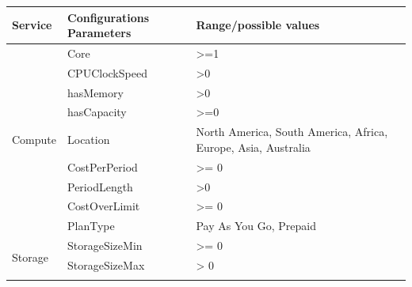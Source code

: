 \begin{table}
\begin{tabular}{|l|p{5.5cm}|p{5.5cm}|}
\hline
Service                  & Configurations Parameters                                         & Range/possible values                                         \\ \hline
\multirow{9}{*}{Compute} & Core                                                              & >=1                                                           \\ \cline{2-3} 
                         & CPUClockSpeed                                                     & >0                                                            \\ \cline{2-3} 
                         & hasMemory                                                         & >0                                                            \\ \cline{2-3} 
                         & hasCapacity                                                       & >=0                                                           \\ \cline{2-3} 
                         & Location                                                          & North America, South America, Africa, Europe, Asia, Australia \\ \cline{2-3} 
                         & CostPerPeriod                                                     & >= 0                                                          \\ \cline{2-3} 
                         & PeriodLength                                                      & >0                                                            \\ \cline{2-3} 
                         & CostOverLimit                                                     & >= 0                                                          \\ \cline{2-3} 
                         & PlanType                                                          & Pay As You Go, Prepaid                                        \\ \hline
\multirow{7}{*}{Storage} & StorageSizeMin                                                    & >= 0                                                          \\ \cline{2-3} 
                         & StorageSizeMax                                                    & > 0                                                           \\ \cline{2-3} 

\end{tabular}
\end{table}
